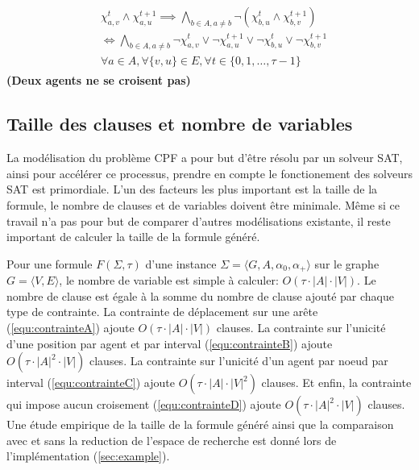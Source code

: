 \documentclass[french, 10pt, letterpaper]{article}
\theoremstyle{definition}
\theoremstyle{proposition}
\theoremstyle{example}
\begin{document}
\begin{itemize}
\begin{align}
                \label{equ:contrainteD}
                \begin{split}
                    &\chi_{a, v}^t \land \chi_{a, u}^{t+1} \implies \bigwedge_{b \in A, a \neq b} \lnot (\chi_{b, u}^t \land \chi_{b, v}^{t+1})
                    \\&\iff \bigwedge_{b \in A, a \neq b} \lnot \chi_{a, v}^t \lor \lnot \chi_{a, u}^{t+1} \lor \lnot \chi_{b, u}^t \lor \lnot \chi_{b, v}^{t+1}
                    \\&\forall a \in A, \forall \{v, u\} \in E, \forall t \in \{0, 1, \ldots, \tau-1\}
                \end{split}
            \end{align}
            \textbf{(Deux agents ne se croisent pas)}
    \end{itemize}

    \subsection{Taille des clauses et nombre de variables}
    \label{sec:tailleclause}

    La modélisation du problème CPF a pour but d'être résolu par un solveur SAT, ainsi pour accélérer ce processus, prendre en compte le fonctionement
    des solveurs SAT est primordiale. L'un des facteurs les plus important est la taille de la formule, le nombre de clauses et de variables doivent être minimale.
    Même si ce travail n'a pas pour but de comparer d'autres modélisations existante, il reste important de calculer la taille de la formule généré.

    Pour une formule $F(\Sigma, \tau)$ d'une instance $\Sigma=\langle G, A, \alpha_0, \alpha_+\rangle$ sur le graphe $G = \langle V, E \rangle$, 
    le nombre de variable est simple à calculer: $O(\tau \cdot |A| \cdot |V|)$. 
    Le nombre de clause est égale à la somme du nombre de clause ajouté par chaque type de contrainte.
    La contrainte de déplacement sur une arête (\ref{equ:contrainteA}) ajoute $O(\tau \cdot |A| \cdot |V|)$ clauses.
    La contrainte sur l'unicité d'une position par agent et par interval (\ref{equ:contrainteB}) ajoute $O(\tau \cdot |A|^2 \cdot |V|)$ clauses.
    La contrainte sur l'unicité d'un agent par noeud par interval (\ref{equ:contrainteC}) ajoute $O(\tau \cdot |A| \cdot |V|^2)$ clauses.
    Et enfin, la contrainte qui impose aucun croisement (\ref{equ:contrainteD}) ajoute $O(\tau \cdot |A|^2 \cdot |V|)$ clauses.
    Une étude empirique de la taille de la formule généré ainsi que la comparaison avec et sans la reduction de l'espace de recherche est donné lors
    de l'implémentation (\ref{sec:example}).
\end{document}
